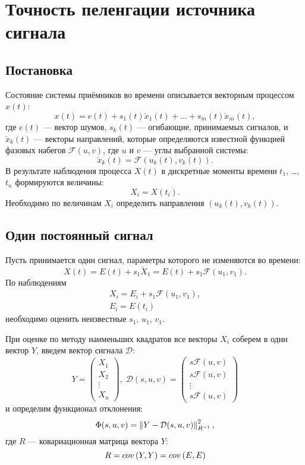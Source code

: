 \chapter{Точность пеленгации источника сигнала}
\section{Постановка}

Состояние системы приёмников во времени описывается векторным процессом $x(t)$:
\[
    x(t) = e(t) + s_1(t) \breve{x}_1(t) + \dots + s_m(t) \breve{x}_m(t) ,
\]
где $e(t)$ --- вектор шумов, $s_k(t)$ --- огибающие, принимаемых сигналов, и $\breve{x}_k(t)$ --- векторы направлений,
которые определяются известной функцией фазовых набегов $\mathcal{F}(u,v)$, где $u$ и $v$ --- углы выбранной системы:
\[
    \breve{x}_k(t) = \mathcal{F}(u_k(t), v_k(t)) .
\]
В результате наблюдения процесса $X(t)$ в дискретные моменты времени $t_1$, \dots, $t_n$ формируются величины:
\[
    X_i = X(t_i) .
\]
Необходимо по величинам $X_i$ определить направления $(u_k(t), v_k(t))$.

\section{Один постоянный сигнал}

Пусть принимается один сигнал, параметры которого не изменяются во времени:
\[
    X(t)
    = E(t) + s_1 \breve{X}_1
    = E(t) + s_1 \mathcal{F}(u_1, v_1) .
\]
По наблюдениям
\begin{gather*}
    X_i = E_i + s_1 \mathcal{F}(u_1, v_1), \\
    E_i = E(t_i)
\end{gather*}
необходимо оценить неизвестные $s_1$, $u_1$, $v_1$.

При оценке по методу наименьших квадратов все векторы $X_i$ соберем в один вектор $Y$, введем вектор сигнала $\mathcal{D}$:
\[
    Y =
    \begin{pmatrix}
        X_1    \\
        X_2    \\
        \vdots \\
        X_n
    \end{pmatrix}
    , \;
    \mathcal{D}(s, u, v) =
    \begin{pmatrix}
        s \mathcal{F}(u, v) \\
        s \mathcal{F}(u, v) \\
        \vdots              \\
        s \mathcal{F}(u, v)
    \end{pmatrix}
\]
и определим функционал отклонения:
\[
    \Phi(s,u,v)
    = \left \| Y - \mathcal{D}(s,u,v) \right \|_{R^{-1}}^2 ,
\]
где $R$ --- ковариационная матрица вектора $Y$:
\[
    R
    = cov \left( Y, Y \right)
    = cov \left( E, E \right)
\]

